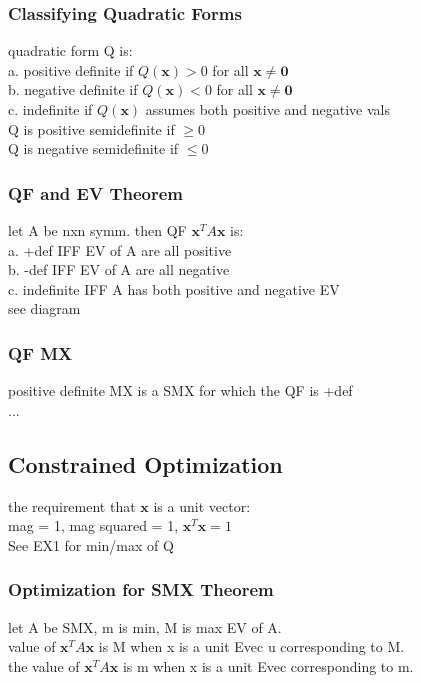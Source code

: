 \documentclass[12pt]{article}
\begin{document}
    \subsubsection{Classifying Quadratic Forms}
        quadratic form Q is:\\
        a. positive definite if $Q(\bm{x}) > 0$ for all $\bm{x}\ne \bm{0}$ \\
        b. negative definite if $Q(\bm{x}) < 0$ for all $\bm{x}\ne \bm{0}$ \\
        c. indefinite if $Q(\bm{x})$  assumes both positive and negative vals \\
        Q is positive semidefinite if $\ge 0$ \\
        Q is negative semidefinite if $\le 0$  
    \subsubsection{QF and EV Theorem}
        let A be nxn symm. then QF $\bm{x}^TA\bm{x}$ is:\\
        a. +def IFF EV of A are all positive\\
        b. -def IFF EV of A are all negative \\
        c. indefinite IFF A has both positive and negative EV\\
        see diagram
    \subsubsection{QF MX}
        positive definite MX is a SMX for which the QF is +def \\
        ...
\subsection{Constrained Optimization}
    the requirement that $\bm{x}$  is  a unit vector:\\
    mag = 1, mag squared = 1, $\bm{x}^T\bm{x}= 1$ \\
    See EX1 for min/max of Q 
    \subsubsection{Optimization for SMX Theorem}
        let A be SMX, m is min, M is max EV of A.\\
        value of $\bm{x}^TA\bm{x}$  is M when x is a unit Evec 
        u corresponding to M.\\
        the value of $\bm{x}^TA\bm{x}$ is m when x is a unit Evec
        corresponding to m.
\end{document}
